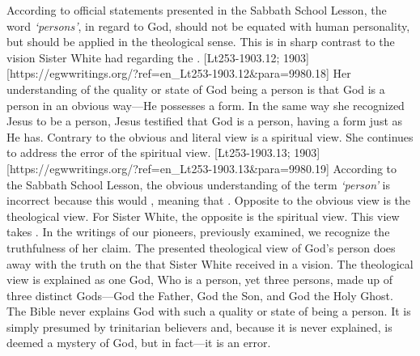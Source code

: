 According to official statements presented in the Sabbath School Lesson, the word \textit{‘persons’},\textit{ }in regard to God, should not be equated with human personality, but should be applied in the theological sense. This is in sharp contrast to the vision Sister White had regarding the . [Lt253-1903.12; 1903][https://egwwritings.org/?ref=en\_Lt253-1903.12&para=9980.18] Her understanding of the quality or state of God being a person is that God is a person in an obvious way—He possesses a form. In the same way she recognized Jesus to be a person, Jesus testified that God is a person, having a form just as He has. Contrary to the obvious and literal view is a spiritual view. She continues to address the error of the spiritual view. [Lt253-1903.13; 1903][https://egwwritings.org/?ref=en\_Lt253-1903.13&para=9980.19] According to the Sabbath School Lesson, the obvious understanding of the term \textit{‘person’ }is incorrect because this would , meaning that . Opposite to the obvious view is the theological view. For Sister White, the opposite is the spiritual view. This view takes . In the writings of our pioneers, previously examined, we recognize the truthfulness of her claim. The presented theological view of God’s person does away with the truth on the  that Sister White received in a vision. The theological view is explained as one God, Who is a person, yet three persons, made up of three distinct Gods—God the Father, God the Son, and God the Holy Ghost. The Bible never explains God with such a quality or state of being a person. It is simply presumed by trinitarian believers and, because it is never explained, is deemed a mystery of God, but in fact—it is an error.


